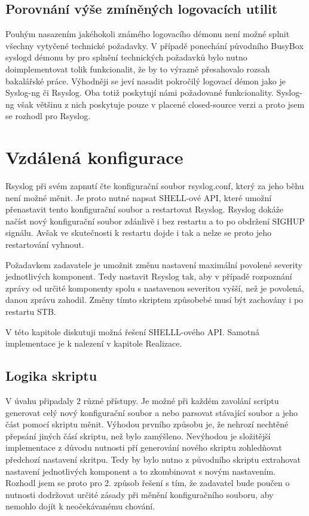 \documentclass[thesis=B,czech]{FITthesis}[2012/06/26]
\begin{document}
\subsection{Porovnání výše zmíněných logovacích utilit}
Pouhým nasazením jakéhokoli známého logovacího démonu není možné splnit všechny vytyčené technické požadavky. V případě ponechání původního BusyBox syslogd démonu by pro splnění technických požadavků bylo nutno doimplementovat tolik funkcionalit, že by to výrazně přesahovalo rozsah bakalářské práce.
Výhodněji se jeví nasadit pokročilý logovací démon jako je Syslog-ng či Rsyslog. Oba totiž poskytují námi požadované funkcionality. Syslog-ng však většinu z nich poskytuje pouze v placené closed-source verzi a proto jsem se rozhodl pro Rsyslog.

\section{Vzdálená konfigurace}
Rsyslog při svém zapnutí čte konfigurační soubor rsyslog.conf, který za jeho běhu není možné měnit. Je proto nutné napsat SHELL-ové API, které umožní přenastavit tento konfigurační soubor a restartovat Rsyslog. Rsyslog dokáže načíst nový konfigurační soubor zdánlivě i bez restartu a to po obdržení SIGHUP signálu. Avšak ve skutečnosti \cite{RsyslogHUP} k restartu dojde i tak a nelze se proto jeho restartování vyhnout.

Požadavkem zadavatele je umožnit změnu nastavení maximální povolené severity jednotlivých komponent. Tedy nastavit Rsyslog tak, aby v případě rozpoznání zprávy od určité komponenty spolu s nastavenou severitou vyšší, než je povolená, danou zprávu zahodil. Změny tímto skriptem způsobebé musí být zachovány i po restartu STB.

V této kapitole diskutuji možná řešení SHELLL-ového API. Samotná implementace je k nalezení v kapitole Realizace.

\subsection{Logika skriptu}
V úvahu připadaly 2 různé přístupy. Je možné při každém zavolání scriptu generovat celý nový konfigurační soubor a nebo parsovat stávající soubor a jeho část pomocí skriptu měnit.
Výhodou prvního způsobu je, že nehrozí nechtěné přepsání jiných čásí skriptu, než bylo zamýšleno. Nevýhodou je složitější implementace z důvodu nutnosti pří generování nového skriptu zohledňovat předchozí nastavení skritpu. Tedy by bylo nutno z původního skriptu extrahovat nastavení jednotlivých komponent a to zkombinovat s novým nastavením.
Rozhodl jsem se proto pro 2. způsob řešení s tím, že zadavatel bude poučen o nutnosti dodržovat určité zásady při měnění konfiguračního souboru, aby nemohlo dojít k neočekávanému chování.
\end{document}
